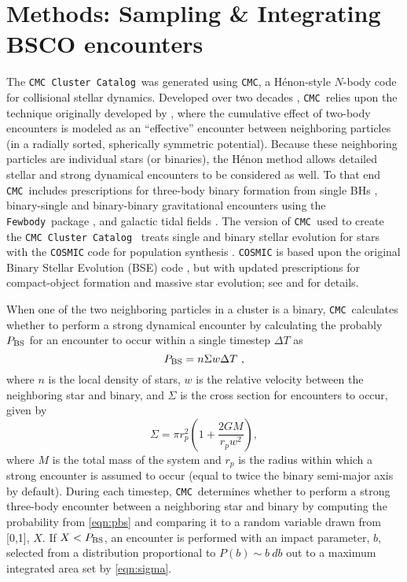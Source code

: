\documentclass[twocolumn,linenumbers]{aastex631}
\newcommand{\CMC}{\texttt{CMC}}
\newcommand{\CMCcat}{\texttt{CMC Cluster Catalog}}
\newcommand{\fewbody}{\texttt{Fewbody}}
\begin{document}
\section{Methods: Sampling \& Integrating BSCO encounters} \label{sec:methods}

The \CMCcat\ was generated using \CMC, a H\'enon-style $N$-body code for collisional stellar dynamics.  Developed over two decades \citep{2000ApJ...540..969J,2013ApJS..204...15P,Rodriguez2022}, \CMC\ relies upon the technique originally developed by \citet{1971Ap&SS..13..284H,1971Ap&SS..14..151H}, where the cumulative effect of two-body encounters is modeled as an ``effective'' encounter between neighboring particles (in a radially sorted, spherically symmetric  potential).  Because these neighboring particles are individual stars (or binaries), the H\'enon method allows detailed stellar and strong dynamical encounters to be considered as well. To that end \CMC~includes prescriptions for three-body binary formation from single BHs \citep{2013ApJ...763L..15M}, binary-single and binary-binary gravitational encounters using the \fewbody\ package \citep{2004MNRAS.352....1F,2007ApJ...658.1047F}, and galactic tidal fields \citep{2013MNRAS.429.2881C}.  The version of \CMC\ used to create the \CMCcat~\citep[which used identical physics to the public version described in][]{Rodriguez2022} treats single and binary stellar evolution for stars with  the \texttt{COSMIC} code for population synthesis \citep{2020ApJ...898...71B}.  \texttt{COSMIC} is based upon the original Binary Stellar Evolution (BSE) code \citep{2000MNRAS.315..543H,2002MNRAS.329..897H}, but with updated prescriptions for compact-object formation and massive star evolution; see \citet{2020ApJ...898...71B} and \citet{Rodriguez2022} for details.

When one of the two neighboring particles in a cluster is a binary, \CMC\ calculates whether to perform a strong dynamical encounter by calculating the probably $P_{\rm BS}$ for an encounter to occur within a single timestep $\Delta T$ as
\begin{equation}
P_{\rm BS} = n \Sigma w \Delta T~,
\label{eqn:pbs}
\end{equation}
where $n$ is the local density of stars, $w$ is the relative velocity between the neighboring star and binary, and $\Sigma$ is the cross section for encounters to occur, given by
\begin{equation}
\Sigma = \pi r_p^2 \left(1+\frac{2 G M}{r_p w^2}\right),
\label{eqn:sigma}
\end{equation}
where $M$ is the total mass of the system and $r_p$ is the radius within which a strong encounter is assumed to occur (equal to twice the binary semi-major axis by default).  
During each timestep, \CMC\ determines whether to perform a strong three-body encounter between a neighboring star and binary by computing the probability from \ref{eqn:pbs} and comparing it to a random variable drawn from [0,1], $X$.  If $X < P_{\rm BS}$, an encounter is performed with an impact parameter, $b$, selected from a distribution proportional to $P(b) \sim b~db$ out to a maximum integrated area set by \ref{eqn:sigma}.
\end{document}
